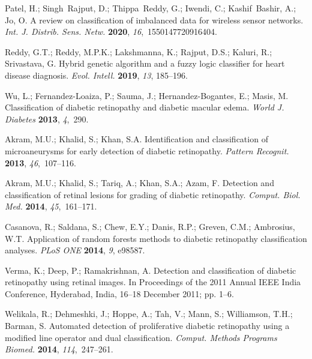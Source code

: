 \documentclass[electronics,article,accept ,moreauthors,pdftex]{mdpi}
\begin{document}
\begin{thebibliography}{999}
Patel, H.; Singh~Rajput, D.; Thippa~Reddy, G.; Iwendi, C.; Kashif~Bashir, A.;
 Jo, O.
A review on classification of imbalanced data for wireless sensor networks.
{\em Int. J. Distrib. Sens. Netw.} {\bf 2020}, {\em 16},~1550147720916404.

Reddy, G.T.; Reddy, M.P.K.; Lakshmanna, K.; Rajput, D.S.; Kaluri, R.;
 Srivastava, G.
Hybrid genetic algorithm and a fuzzy logic classifier for heart
 disease diagnosis.
{\em Evol. Intell.} {\bf 2019}, \emph{13}, 185--196.

Wu, L.; Fernandez-Loaiza, P.; Sauma, J.; Hernandez-Bogantes, E.; Masis, M.
Classification of diabetic retinopathy and diabetic macular edema.
{\em World J. Diabetes} {\bf 2013}, {\em 4},~290.

Akram, M.U.; Khalid, S.; Khan, S.A.
Identification and classification of microaneurysms for early
 detection of diabetic retinopathy.
{\em Pattern Recognit.} {\bf 2013}, {\em 46},~107--116.

Akram, M.U.; Khalid, S.; Tariq, A.; Khan, S.A.; Azam, F.
Detection and classification of retinal lesions for grading of
 diabetic retinopathy.
{\em Comput. Biol. Med.} {\bf 2014}, {\em
 45},~161--171.

Casanova, R.; Saldana, S.; Chew, E.Y.; Danis, R.P.; Greven, C.M.; Ambrosius,
 W.T.
Application of random forests methods to diabetic retinopathy
 classification analyses.
{\em PLoS ONE} {\bf 2014}, {\em 9}, e98587.

Verma, K.; Deep, P.; Ramakrishnan, A.
Detection and classification of diabetic retinopathy using retinal images.
In Proceedings of the 2011 Annual IEEE India Conference, Hyderabad, India, 16--18 December 2011; pp. 1--6.

Welikala, R.; Dehmeshki, J.; Hoppe, A.; Tah, V.; Mann, S.; Williamson, T.H.;
 Barman, S.
Automated detection of proliferative diabetic retinopathy using a
 modified line operator and dual classification.
{\em Comput. Methods Programs Biomed.} {\bf 2014}, {\em
 114},~247--261.


\end{thebibliography}
\end{document}
